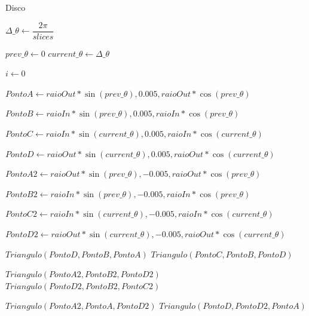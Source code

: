 \begin{landscape}
\thispagestyle{empty} %
\begin{algorithm}
\caption{Disco}\label{alg:sec1:disco}

\begin{center}

\begin{algorithmic}[1]
\State$\Delta\_\theta \gets \dfrac{2\pi}{slices}$


\State$prev\_\theta \gets 0$
\State$current\_\theta \gets \Delta\_\theta$

\State$i \gets 0$



\State$Ponto A \gets raioOut*\sin(prev\_\theta),
 0.005,
 raioOut*\cos(prev\_\theta)$

\State$Ponto B \gets raioIn*\sin(prev\_\theta),
 0.005,
 raioIn*\cos(prev\_\theta)$

\State$Ponto C \gets raioIn*\sin(current\_\theta),
 0.005,
 raioIn*\cos(current\_\theta)$

\State$Ponto D \gets raioOut*\sin(current\_\theta),
  0.005,
 raioOut*\cos(current\_\theta)$

\State$Ponto A2 \gets raioOut*\sin(prev\_\theta),
 -0.005,
 raioOut*\cos(prev\_\theta)$

\State$Ponto B2 \gets raioIn*\sin(prev\_\theta),
 -0.005,
 raioIn*\cos(prev\_\theta)$

\State$Ponto C2 \gets raioIn*\sin(current\_\theta),
 -0.005,
 raioIn*\cos(current\_\theta)$

\State$Ponto D2 \gets raioOut*\sin(current\_\theta),
  -0.005,
 raioOut*\cos(current\_\theta)$





\State$Triangulo(Ponto D, Ponto B, Ponto A)$ 
\State$Triangulo(Ponto C, Ponto B, Ponto D)$ 



\State$Triangulo(Ponto A2, Ponto B2, Ponto D2)$ 
\State$Triangulo(Ponto D2, Ponto B2, Ponto C2)$   
		  
\State$Triangulo(Ponto A2, Ponto A, Ponto D2)$
\State$Triangulo(Ponto D, Ponto D2, Ponto A)$
  

\end{algorithmic}
\end{center}
\end{algorithm}
\end{landscape}
